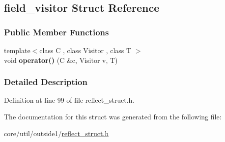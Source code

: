 \hypertarget{structfield__visitor}{}\subsection{field\+\_\+visitor Struct Reference}
\label{structfield__visitor}
\subsubsection*{Public Member Functions}
\begin{DoxyCompactItemize}
\item 
{\footnotesize template$<$class C , class Visitor , class T $>$ }\\void {\bfseries operator()} (C \&c, Visitor v, T)\hypertarget{structfield__visitor_ae6339526f3fb9708c216c2b508724acf}{}\label{structfield__visitor_ae6339526f3fb9708c216c2b508724acf}

\end{DoxyCompactItemize}


\subsubsection{Detailed Description}


Definition at line 99 of file reflect\+\_\+struct.\+h.



The documentation for this struct was generated from the following file\+:\begin{DoxyCompactItemize}
\item 
core/util/outside1/\hyperlink{reflect__struct_8h}{reflect\+\_\+struct.\+h}\end{DoxyCompactItemize}
